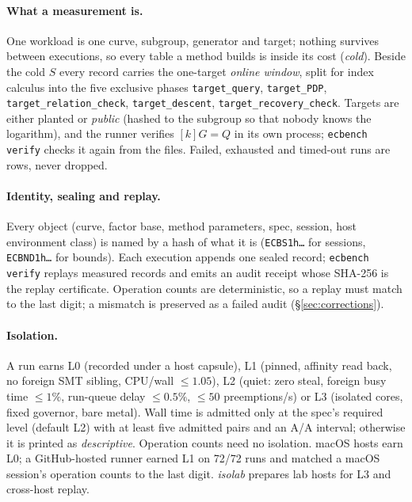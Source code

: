 \paragraph{What a measurement is.} One workload is one curve, subgroup,
generator and target; nothing survives between executions, so every table
a method builds is inside its cost (\emph{cold}). Beside the cold $S$
every record carries the one-target \emph{online window}, split for index
calculus into the five exclusive phases \texttt{target\_query},
\texttt{target\_PDP}, \texttt{target\_relation\_check},
\texttt{target\_descent}, \texttt{target\_recovery\_check}. Targets are
either planted or \emph{public} (hashed to the subgroup so that nobody
knows the logarithm), and the runner verifies $[k]G=Q$ in its own process;
\texttt{ecbench verify} checks it again from the files. Failed, exhausted
and timed-out runs are rows, never dropped.

\paragraph{Identity, sealing and replay.} Every object (curve, factor
base, method parameters, spec, session, host environment class) is named by
a hash of what it is (\texttt{ECBS1h\ldots} for sessions,
\texttt{ECBND1h\ldots} for bounds). Each execution appends one sealed
record; \texttt{ecbench verify} replays measured records and emits an audit
receipt whose SHA-256 is the replay certificate. Operation counts are
deterministic, so a replay must match to the last digit; a mismatch is
preserved as a failed audit (\S\ref{sec:corrections}).

\paragraph{Isolation.} A run earns L0 (recorded under a host capsule), L1
(pinned, affinity read back, no foreign SMT sibling, CPU/wall $\le1.05$),
L2 (quiet: zero steal, foreign busy time $\le1\%$, run-queue delay
$\le0.5\%$, $\le50$ preemptions/s) or L3 (isolated cores, fixed governor,
bare metal). Wall time is admitted only at the spec's required level
(default L2) with at least five admitted pairs and an A/A interval;
otherwise it is printed as \emph{descriptive}. Operation counts need no
isolation. macOS hosts earn L0; a GitHub-hosted runner earned L1 on 72/72
runs and matched a macOS session's operation counts to the last digit.
\emph{isolab} prepares lab hosts for L3 and cross-host replay.

